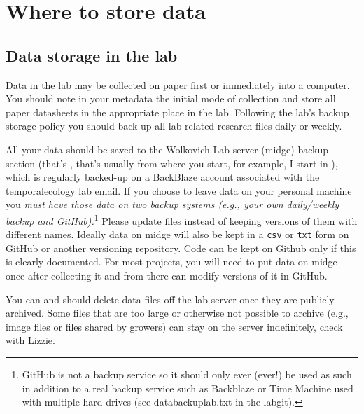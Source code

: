 \documentclass[11pt,a4paper,oneside]{article}
\begin{document}
\section{Where to store data}
\subsection{Data storage in the lab}
\label{labstorage}
Data in the lab may be collected on paper first or immediately into a computer. You should note in your metadata the initial mode of collection and store all paper datasheets in the appropriate place in the lab. Following the lab's backup storage policy you should back up all lab related research files daily or weekly. 

All your data should be saved to the Wolkovich Lab server (midge) backup section (that's , that's usually  from where you start, for example, I start in ), which is regularly backed-up on a BackBlaze account associated with the temporalecology lab email. If you choose to leave data on your personal machine you \emph{must have those data on two backup systems (e.g., your own daily/weekly backup and GitHub).}\footnote{GitHub is not a backup service so it should only ever (ever!) be used as such in addition to a real backup service such as Backblaze or Time Machine used with multiple hard drives (see databackuplab.txt in the labgit).} Please update files instead of keeping versions of them with different names. Ideally data on midge will also be kept in a \verb|csv| or \verb|txt| form on GitHub or another versioning repository. Code can be kept on Github only if this is clearly documented. For most projects, you will need to put data on midge once after collecting it and from there can modify versions of it in GitHub. 

You can and should delete data files off the lab server once they are publicly archived. Some files that are too large or otherwise not possible to archive (e.g., image files or files shared by growers) can stay on the server indefinitely, check with Lizzie. 

\end{document}
